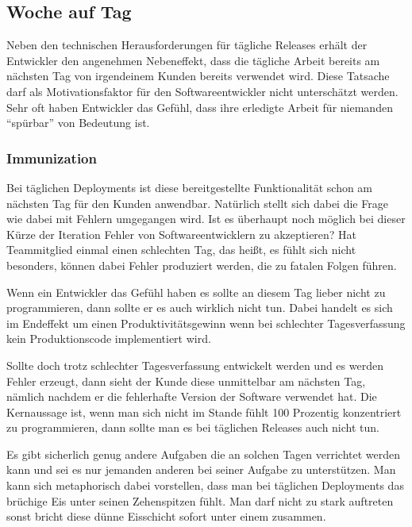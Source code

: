 \subsection{Woche auf Tag}
\label{subsec:subscription-modell}

Neben den technischen Herausforderungen für tägliche Releases erhält der Entwickler den angenehmen Nebeneffekt, dass die tägliche Arbeit bereits am nächsten Tag von irgendeinem Kunden bereits verwendet wird. Diese Tatsache darf als Motivationsfaktor für den Softwareentwickler nicht unterschätzt werden. Sehr oft haben Entwickler das Gefühl, dass ihre erledigte Arbeit für niemanden \enquote{spürbar} von Bedeutung ist.

\subsubsection{Immunization}
\label{minisec:immunization}
Bei täglichen Deployments ist diese bereitgestellte Funktionalität schon am nächsten Tag für den Kunden anwendbar. Natürlich stellt sich dabei die Frage wie dabei mit Fehlern umgegangen wird. Ist es überhaupt noch möglich bei dieser Kürze der Iteration Fehler von Softwareentwicklern zu akzeptieren? Hat Teammitglied einmal einen schlechten Tag, das heißt, es fühlt sich nicht besonders, können dabei Fehler produziert werden, die zu fatalen Folgen führen. 

Wenn ein Entwickler das Gefühl haben es sollte an diesem Tag lieber nicht zu programmieren, dann sollte er es auch wirklich nicht tun. Dabei handelt es sich im Endeffekt um einen Produktivitätsgewinn wenn bei schlechter Tagesverfassung kein Produktionscode implementiert wird. 

Sollte doch trotz schlechter Tagesverfassung entwickelt werden und es werden Fehler erzeugt, dann sieht der Kunde diese unmittelbar am nächsten Tag, nämlich nachdem er die fehlerhafte Version der Software verwendet hat. Die Kernaussage ist, wenn man sich nicht im Stande fühlt 100 Prozentig konzentriert zu programmieren, dann sollte man es bei täglichen Releases auch nicht tun. 

Es gibt sicherlich genug andere Aufgaben die an solchen Tagen verrichtet werden kann und sei es nur jemanden anderen bei seiner Aufgabe zu unterstützen. Man kann sich metaphorisch dabei vorstellen, dass man bei täglichen Deployments das brüchige Eis unter seinen Zehenspitzen fühlt. Man darf nicht zu stark auftreten sonst bricht diese dünne Eisschicht sofort unter einem zusammen. 

